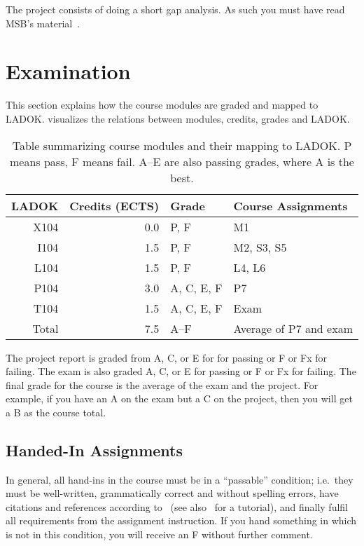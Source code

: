 \documentclass[a4paper]{llncs}
\begin{document}
The project consists of doing a short gap analysis.
As such you must have read MSB's material~\cite{%
  MSB2011itm,MSB2011sle,MSB2011p,MSB2011v,MSB2011r,%
  MSB2011gap,MSB2011vs,MSB2011us,MSB2011upo,%
	MSB2011pg,MSB2011koa,MSB2011i,MSB2011o,MSB2011g,%
	MSB2011lg,MSB2011ulo,MSB2011kf,MSB2011fa%
}.


\section{Examination}
\label{Examination}

This section explains how the course modules are graded and mapped to LADOK\@.
 visualizes the relations between modules, credits, grades and 
LADOK\@.

\begin{table}
  \centering
  \caption{%
    Table summarizing course modules and their mapping to LADOK\@.
    P means pass, F means fail.
    A--E are also passing grades, where A is the best.
  }\label{LADOKTable}
  \begin{tabular}{rrll}
    LADOK & Credits (ECTS)  & Grade       & Course Assignments\\
    \toprule
    X104  & 0.0             & P, F        & M1\\
    I104  & 1.5             & P, F        & M2, S3, S5\\
    L104  & 1.5             & P, F        & L4, L6\\
    P104  & 3.0             & A, C, E, F  & P7\\
    T104  & 1.5             & A, C, E, F  & Exam\\
    \midrule
    Total & 7.5             & A--F        & Average of P7 and exam\\
    \bottomrule
  \end{tabular}
\end{table}

The project report is graded from A, C, or E for for passing or F or Fx for 
failing.
The exam is also graded A, C, or E for passing or F or Fx for failing.
The final grade for the course is the average of the exam and the project.
For example, if you have an A on the exam but a C on the project, then you will 
get a B as the course total.

\subsection{Handed-In Assignments}

In general, all hand-ins in the course must be in a \enquote{passable} 
condition; i.e.~they must be well-written, grammatically correct and without 
spelling errors, have citations and references according to~\cite{IEEEcitation} 
(see also~\cite{PurdueCitation} for a tutorial), and finally fulfil all 
requirements from the assignment instruction.
If you hand something in which is not in this condition, you will receive an 
F without further comment.
\end{document}
